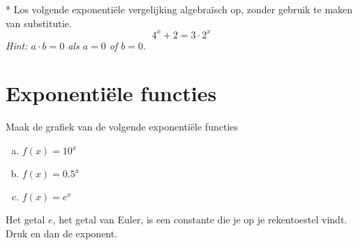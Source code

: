 \documentclass[12pt,twoside]{article}
\begin{document}
\begin{oefening}*
Los volgende exponentiële vergelijking algebraïsch op, zonder gebruik te maken van substitutie.
$$4^x+2=3\cdot2^x$$
{\em Hint: $a\cdot b=0$ als $a=0$ of $b=0$.}
\end{oefening}

\pagebreak
\section{Exponentiële functies}

\begin{oefening}
Maak de grafiek van de volgende exponentiële functies
\begin{multicols}{3}
\begin{enumerate}[(a)]
  \itemsep.5em
  \item $f(x)=10^x$
  \item $f(x)=0.5^x$
  \item $f(x)=e^x$
\end{enumerate}
\end{multicols}
Het getal $e$, het getal van Euler, is een constante die je op je rekentoestel vindt. Druk   en dan de exponent.
\end{oefening}
\end{document}
